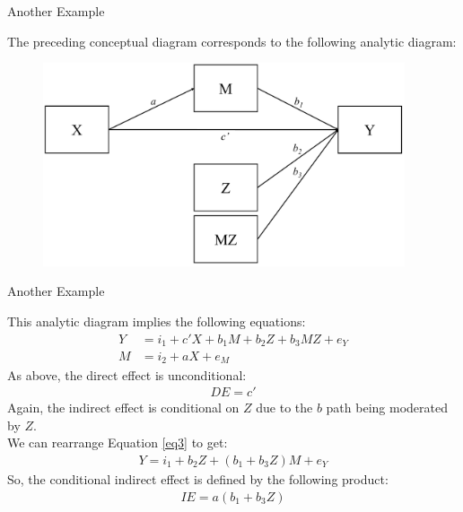 \documentclass{beamer}
\newcommand{\va}[0]{\vspace{12pt}}
\newcommand{\vb}[0]{\vspace{6pt}}
\begin{document}
\begin{frame}{Another Example}
  
  The preceding conceptual diagram corresponds to the following
  analytic diagram: 
  \vb
  \begin{figure}
    \includegraphics[width=0.95\textwidth]{figures/modBwithZAnalytic.pdf}
  \end{figure}
  
\end{frame}



\begin{frame}{Another Example}
  
  This analytic diagram implies the following equations:
  \begin{align}
    Y &= i_1 + c'X + b_1M + b_2Z + b_3MZ + e_Y \label{eq3}\\
    M &= i_2 + aX + e_M
  \end{align}
  \pause
  As above, the direct effect is unconditional:
  \begin{align*}
    DE = c'
  \end{align*}
  \pause 
  Again, the indirect effect is conditional on $Z$ due to the
  $b$ path being moderated by $Z$.\\ 
  \va 
  \pause 
  We can rearrange Equation \ref{eq3} to get:
  \begin{align*}
    Y = i_1 + b_2Z + \left( b_1 + b_3Z \right)M + e_Y
  \end{align*}
  So, the conditional indirect effect is defined by the following
  product:
  \begin{align*}
    IE = a \left(b_1 + b_3Z \right)
  \end{align*}
  
\end{frame}
\end{document}
